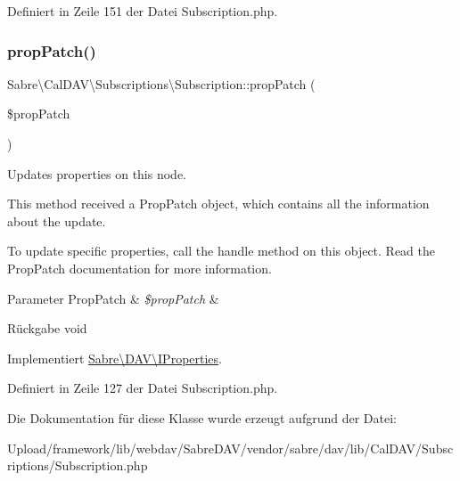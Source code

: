 Definiert in Zeile 151 der Datei Subscription.\+php.

\mbox{\label{class_sabre_1_1_cal_d_a_v_1_1_subscriptions_1_1_subscription_a54715146cf54f0368920d5fa315c609c}} 
\subsubsection{\texorpdfstring{prop\+Patch()}{propPatch()}}
{\footnotesize\ttfamily Sabre\textbackslash{}\+Cal\+D\+A\+V\textbackslash{}\+Subscriptions\textbackslash{}\+Subscription\+::prop\+Patch (\begin{DoxyParamCaption}\item[{\mbox{\hyperlink{class_sabre_1_1_d_a_v_1_1_prop_patch}{Prop\+Patch}}}]{\$prop\+Patch }\end{DoxyParamCaption})}

Updates properties on this node.

This method received a Prop\+Patch object, which contains all the information about the update.

To update specific properties, call the \textquotesingle{}handle\textquotesingle{} method on this object. Read the Prop\+Patch documentation for more information.


\begin{DoxyParams}[1]{Parameter}
Prop\+Patch & {\em \$prop\+Patch} & \\
\hline
\end{DoxyParams}
\begin{DoxyReturn}{Rückgabe}
void 
\end{DoxyReturn}


Implementiert \mbox{\hyperlink{interface_sabre_1_1_d_a_v_1_1_i_properties_a90973262bb85b17f98183ecd600acd84}{Sabre\textbackslash{}\+D\+A\+V\textbackslash{}\+I\+Properties}}.



Definiert in Zeile 127 der Datei Subscription.\+php.



Die Dokumentation für diese Klasse wurde erzeugt aufgrund der Datei\+:\begin{DoxyCompactItemize}
\item 
Upload/framework/lib/webdav/\+Sabre\+D\+A\+V/vendor/sabre/dav/lib/\+Cal\+D\+A\+V/\+Subscriptions/Subscription.\+php\end{DoxyCompactItemize}
